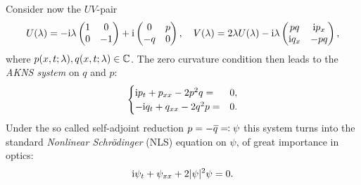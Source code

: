 \begin{example}
    Consider now the $UV$-pair 
    \[
    U(\lambda)=-\mathrm{i}\lambda
    \begin{pmatrix}
        1 & 0\\
        0 & -1
    \end{pmatrix}+\mathrm{i}\begin{pmatrix}
        0 & p\\
        -q & 0
    \end{pmatrix},\quad 
    V(\lambda)=
    2\lambda U(\lambda)
    -\mathrm{i}\lambda\begin{pmatrix}
        pq & \mathrm{i} p_x\\
        \mathrm{i} q_x & -pq
    \end{pmatrix},\label{eq AKNS UV pair}
    \]
    where $p(x,t;\lambda),q(x,t;\lambda)\in\mathbb{C}$. The zero curvature condition then leads to the \emph{AKNS system} on $q$ and $p$:
    \[
        \begin{cases}
            \mathrm{i} p_t+p_{xx}-2p^2q= &0,\\
            -\mathrm{i} q_t+q_{xx}-2q^2p= &0.
        \end{cases}    
    \]
    Under the so called self-adjoint reduction $p=-\wb{q}\eqqcolon \psi$ this system turns into the standard \emph{Nonlinear Schr\"odinger} (NLS) equation on $\psi$, of great importance in optics:
    \[\mathrm{i}\psi_t+\psi_{xx}+2|\psi|^2\psi=0.\]
\end{example}


